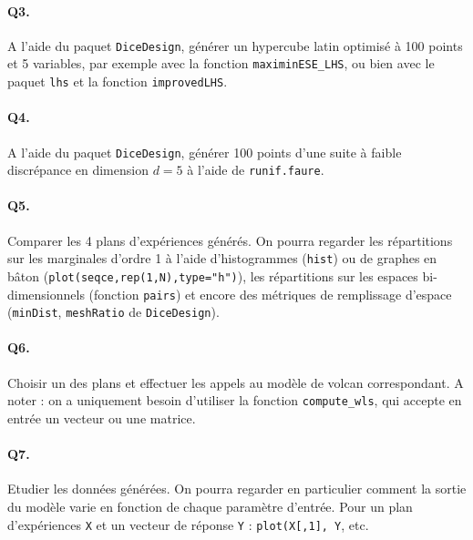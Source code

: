 \documentclass[12pt]{scrartcl}
\begin{document}
\paragraph{Q3.} A l'aide du paquet \texttt{DiceDesign}, générer un hypercube latin optimisé à 100 points et 5 variables, par exemple avec la fonction \texttt{maximinESE\_LHS}, ou bien avec le paquet \texttt{lhs} et la fonction \texttt{improvedLHS}.

\paragraph{Q4.} A l'aide du paquet \texttt{DiceDesign}, générer 100 points d'une suite à faible discrépance en dimension $d=5$ à l'aide de \texttt{runif.faure}.

\paragraph{Q5.} Comparer les 4 plans d'expériences générés. 
On pourra regarder les répartitions sur les marginales d'ordre 1 à l'aide d'histogrammes (\texttt{hist}) ou de graphes en bâton (\texttt{plot(seqce,rep(1,N),type="h")}), 
les répartitions sur les espaces bi-dimensionnels (fonction \texttt{pairs}) et encore des métriques de remplissage d'espace (\texttt{minDist}, \texttt{meshRatio} de \texttt{DiceDesign}).

\paragraph{Q6.} Choisir un des plans et effectuer les appels au modèle de volcan correspondant. A noter : on a uniquement besoin d'utiliser la fonction \texttt{compute\_wls}, qui accepte en entrée un vecteur ou une matrice.

\paragraph{Q7.} Etudier les données générées. On pourra regarder en particulier comment la sortie du modèle varie en fonction de chaque paramètre d'entrée. 
Pour un plan d'expériences \texttt{X} et un vecteur de réponse \texttt{Y} : \texttt{plot(X[,1], Y}, etc.
\end{document}
